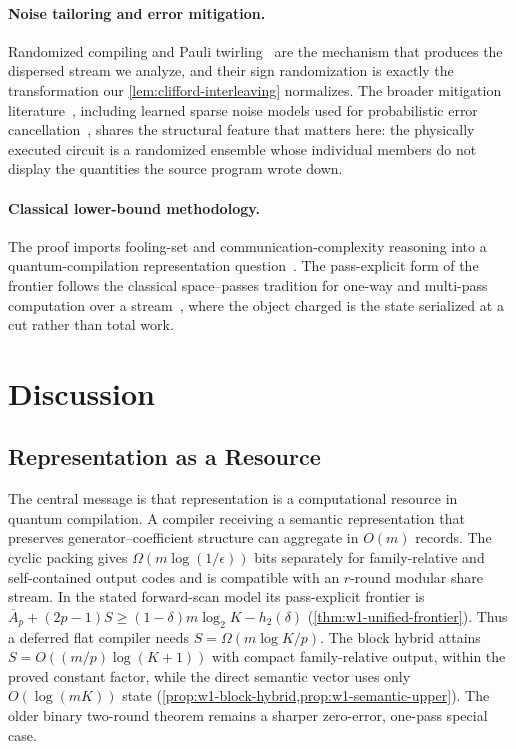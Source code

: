 \documentclass[a4paper,twocolumn,10pt,unpublished]{quantumarticle}
\begin{document}
\paragraph{Noise tailoring and error mitigation.}
Randomized compiling and Pauli
twirling~\cite{wallman2016noise,hashim2021randomized,knill2005realistically}
are the mechanism that produces the dispersed stream we analyze, and
their sign randomization is exactly the transformation our
\cref{lem:clifford-interleaving} normalizes.  The broader mitigation
literature~\cite{cai2023mitigation}, including learned sparse noise
models used for probabilistic error
cancellation~\cite{vandenberg2023probabilistic}, shares the structural
feature that matters here: the physically executed circuit is a
randomized ensemble whose individual members do not display the
quantities the source program wrote down.

\paragraph{Classical lower-bound methodology.}
The proof imports fooling-set and communication-complexity reasoning into
a quantum-compilation representation
question~\cite{sipser2012introduction,kushilevitz1997communication,alur2010streaming}.
The pass-explicit form of the frontier follows the classical
space--passes tradition for one-way and multi-pass computation over a
stream~\cite{munro1980selection,alon1999space}, where the object charged
is the state serialized at a cut rather than total work.


\section{Discussion}
\label{sec:discussion}

\subsection{Representation as a Resource}

The central message is that representation is a computational resource in
quantum compilation.  A compiler receiving a semantic representation that
preserves generator--coefficient structure can aggregate in $O(m)$
records.  The cyclic packing gives
$\Omega(m\log(1/\epsilon))$ bits separately for family-relative and
self-contained output codes and is compatible with an $r$-round modular
share stream.  In the stated forward-scan model its pass-explicit frontier is
$\overline A_p+(2p-1)S\geq
(1-\delta)m\log_2K-h_2(\delta)$
(\cref{thm:w1-unified-frontier}).  Thus a deferred flat compiler needs
$S=\Omega(m\log K/p)$.  The block hybrid attains
$S=O((m/p)\log(K+1))$ with compact family-relative output, within the
proved constant factor, while the direct semantic vector uses only
$O(\log(mK))$ state
(\cref{prop:w1-block-hybrid,prop:w1-semantic-upper}).  The older binary
two-round theorem remains a sharper zero-error, one-pass special case.
\end{document}
